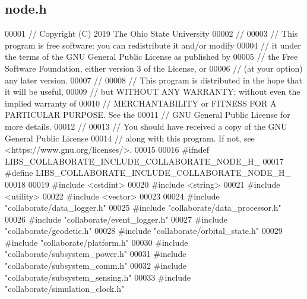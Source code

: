\hypertarget{node_8h_source}{}\subsection{node.\+h}
\label{node_8h_source}

\begin{DoxyCode}
00001 \textcolor{comment}{// Copyright (C) 2019 The Ohio State University}
00002 \textcolor{comment}{//}
00003 \textcolor{comment}{// This program is free software: you can redistribute it and/or modify}
00004 \textcolor{comment}{// it under the terms of the GNU General Public License as published by}
00005 \textcolor{comment}{// the Free Software Foundation, either version 3 of the License, or}
00006 \textcolor{comment}{// (at your option) any later version.}
00007 \textcolor{comment}{//}
00008 \textcolor{comment}{// This program is distributed in the hope that it will be useful,}
00009 \textcolor{comment}{// but WITHOUT ANY WARRANTY; without even the implied warranty of}
00010 \textcolor{comment}{// MERCHANTABILITY or FITNESS FOR A PARTICULAR PURPOSE.  See the}
00011 \textcolor{comment}{// GNU General Public License for more details.}
00012 \textcolor{comment}{//}
00013 \textcolor{comment}{// You should have received a copy of the GNU General Public License}
00014 \textcolor{comment}{// along with this program.  If not, see <https://www.gnu.org/licenses/>.}
00015 
00016 \textcolor{preprocessor}{#ifndef LIBS\_COLLABORATE\_INCLUDE\_COLLABORATE\_NODE\_H\_}
00017 \textcolor{preprocessor}{#define LIBS\_COLLABORATE\_INCLUDE\_COLLABORATE\_NODE\_H\_}
00018 
00019 \textcolor{preprocessor}{#include <cstdint>}
00020 \textcolor{preprocessor}{#include <string>}
00021 \textcolor{preprocessor}{#include <utility>}
00022 \textcolor{preprocessor}{#include <vector>}
00023 
00024 \textcolor{preprocessor}{#include "collaborate/data\_logger.h"}
00025 \textcolor{preprocessor}{#include "collaborate/data\_processor.h"}
00026 \textcolor{preprocessor}{#include "collaborate/event\_logger.h"}
00027 \textcolor{preprocessor}{#include "collaborate/geodetic.h"}
00028 \textcolor{preprocessor}{#include "collaborate/orbital\_state.h"}
00029 \textcolor{preprocessor}{#include "collaborate/platform.h"}
00030 \textcolor{preprocessor}{#include "collaborate/subsystem\_power.h"}
00031 \textcolor{preprocessor}{#include "collaborate/subsystem\_comm.h"}
00032 \textcolor{preprocessor}{#include "collaborate/subsystem\_sensing.h"}
00033 \textcolor{preprocessor}{#include "collaborate/simulation\_clock.h"}

\end{DoxyCode}
